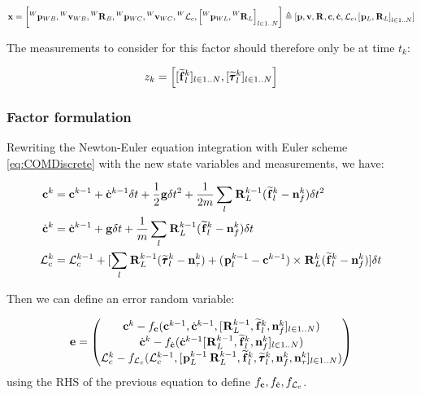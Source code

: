 \documentclass[11pt]{article}
\newcommand{\Rot}[2]{\prescript{#1}{}{\bfR}_{#2}}
\newcommand{\noise}{\bfn}
\newcommand{\posi}[2]{\prescript{#1}{}{\bfp}_{#2}}
\newcommand{\vel}[2]{\prescript{#1}{}{\bfv}_{#2}}
\newcommand{\forcem}[2]{\prescript{#1}{}{\widetilde{\bff}}_{#2}}
\newcommand{\torquem}[2]{\prescript{#1}{}{\widetilde{\pmb{\tau}}}_{#2}}
\newcommand{\AM}{\mathcal{L}}
\newcommand{\COM}{\bfc}
\newcommand{\COMd}{\dot{\bfc}}
\begin{document}
\begin{equation*}
\bfx = \left[\posi{W}{WB}, \vel{W}{WB}, \Rot{W}{B}, \posi{W}{WC}, \vel{W}{WC}, \prescript{W}{}{\AM}_{c}, \left[\posi{W}{WL}, \Rot{W}{L}\right]_{l \in 1..N} \right] 
\triangleq 
[\bfp, \bfv, \Rot{}{}, \COM, \COMd, \AM_c, \left[\posi{}{L}, \Rot{}{L}\right]_{l \in 1..N} ] 
\end{equation*}

The measurements to consider for this factor should therefore only be at time $t_k$:

\begin{equation}
z_k = \left[[\forcem{}{l}^k]_{l \in 1..N}, [\torquem{}{l}^k]_{l \in 1..N} \right]
\end{equation}


\subsubsection{Factor formulation}
Rewriting the Newton-Euler equation integration with Euler scheme \ref{eq:COMDiscrete} with the new state variables and measurements, we have:

\begin{equation}
\begin{split}
\COM^{k} &= \COM^{k-1} + \COMd^{k-1} \delta t 
+ \frac{1}{2} \bfg \delta t^2 + \frac{1}{2m} \sum_l \Rot{}{L}^{k-1} (\forcem{}{l}^{k} - \noise_f^{k}) \delta t^2
\\
\COMd^{k}&= \COMd^{k-1} + \bfg \delta t + \frac{1}{m} \sum_l \Rot{}{L}^{k-1} (\forcem{}{l}^{k} - \noise_f^{k}) \delta t 
\\
\AM_c^{k} &= \AM_c^{k-1} +  [ 
\sum_l \Rot{}{L}^{k-1}(\torquem{}{l}^{k} - \noise_{\tau}^{k}) + (\posi{}{l}^{k-1} - \COM^{k-1}) \times \Rot{}{L}^{k}(\forcem{}{l}^{k} - \noise_f^{k}) 
] \delta t
\end{split}
\label{eq:COMDiscreteFeet}
\end{equation}

Then we can define an error random variable:

\begin{equation}
	\bfe =
	\begin{pmatrix}
	\COM^k - f_{\COM}(\COM^{k-1}, \COMd^{k-1}, [\Rot{}{L}^{k-1}, \forcem{}{l}^k, \noise_f^k]_{l \in 1..N})
	\\
	\COMd^k - f_{\COMd}(\COMd^{k-1} [\Rot{}{L}^{k-1}, \forcem{}{l}^k, \noise_f^k]_{l \in 1..N})
	\\
	\AM_c^k - f_{\AM_c}(\AM_c^{k-1}, [\posi{}{L}^{k-1} \Rot{}{L}^{k-1}, \forcem{}{l}^k, \torquem{}{l}^k, \noise_f^k, \noise_{\tau}^k]_{l \in 1..N})	
	\end{pmatrix}
\end{equation}
using the RHS of the previous equation to define $f_{\COM},f_{\COMd},f_{\AM_c}$.
\end{document}
